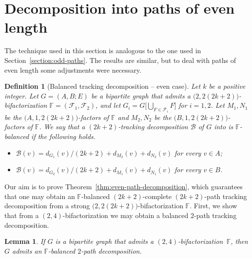 \documentclass[12pt,reqno,a4paper]{amsart}
\newtheorem{lemma}[theorem]{Lemma}
\newtheorem{definition}[theorem]{Definition}
\newcommand{\D}{\mathcal{D}}
\newcommand{\B}{\mathcal{B}}
\begin{document}
\section{Decomposition into paths of even length}\label{section:even-paths}
The technique used in this section is analogous to the one used in 
Section~\ref{section:odd-paths}. 
The results are similar, but to deal with paths of even length some adjustments were necessary.




\begin{definition}[Balanced tracking decomposition -- even case]
Let \(k\) be a positive integer.
Let \(G = (A,B;E)\) be a bipartite graph 
that admits a \(\big(2,2(2k+2)\big)\)-bifactorization 
\(\mathbb{F}=(\mathcal{F}_1,\mathcal{F}_2)\),
and let \(G_i = G\big[\bigcup_{F\in\mathcal{F}_i}F\big]\) for \(i=1,2\).
Let \(M_1,N_1\) be the \(\big(A,1,2(2k+2)\big)\)-factors of \(\mathbb{F}\) and 
\(M_2,N_2\) be the
\(\big(B,1,2(2k+2)\big)\)-factors of \(\mathbb{F}\).
%
We say that a \((2k+2)\)-tracking decomposition \(\B\) of $G$ into is
\emph{\(\mathbb{F}\)-balanced} if the following holds.
	\begin{itemize}
		\item \(\B(v) = d_{G_1}(v)/(2k+2) + d_{M_2}(v)
			+ d_{N_2}(v)\) for every \(v\in A\);
		\item \(\B(v) = d_{G_2}(v)/(2k+2) + d_{M_1}(v)
			+ d_{N_1}(v)\) for every \(v\in B\).
	\end{itemize}
\end{definition}

Our aim is to prove Theorem~\ref{thm:even-path-decomposition}, which
guarantees that one may obtain an $\mathbb{F}$-balanced \((2k+2)\)-complete
$(2k+2)$-path tracking decomposition from a strong
$\big(2,2(2k+2)\big)$-bifactorization $\mathbb{F}$. First, we show
that from a \((2,4)\)-bifactorization we may obtain a balanced $2$-path tracking decomposition.


\begin{lemma}\label{lemma:2-PD}
	If \(G\) is a bipartite graph that admits a 
	\((2,4)\)-bifactorization~\(\mathbb{F}\),
	then \(G\) admits an \(\mathbb{F}\)-balanced $2$-path decomposition.
\end{lemma}
\end{document}

